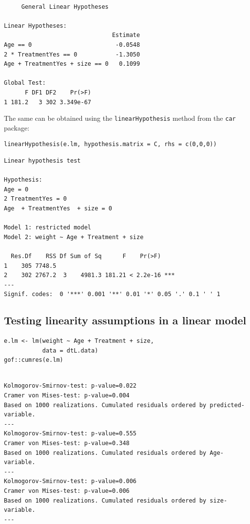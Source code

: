 \documentclass{article}
\begin{document}
\begin{verbatim}

	 General Linear Hypotheses

Linear Hypotheses:
                               Estimate
Age == 0                        -0.0548
2 * TreatmentYes == 0           -1.3050
Age + TreatmentYes + size == 0   0.1099

Global Test:
      F DF1 DF2    Pr(>F)
1 181.2   3 302 3.349e-67
\end{verbatim}

The same can be obtained using the \texttt{linearHypothesis} method from the \texttt{car} package:
\lstset{language=r,label= ,caption= ,captionpos=b,numbers=none}
\begin{lstlisting}
linearHypothesis(e.lm, hypothesis.matrix = C, rhs = c(0,0,0))
\end{lstlisting}

\begin{verbatim}
Linear hypothesis test

Hypothesis:
Age = 0
2 TreatmentYes = 0
Age  + TreatmentYes  + size = 0

Model 1: restricted model
Model 2: weight ~ Age + Treatment + size

  Res.Df    RSS Df Sum of Sq      F    Pr(>F)    
1    305 7748.5                                  
2    302 2767.2  3    4981.3 181.21 < 2.2e-16 ***
---
Signif. codes:  0 '***' 0.001 '**' 0.01 '*' 0.05 '.' 0.1 ' ' 1
\end{verbatim}

\subsection{Testing linearity assumptions in a linear model}
\label{sec:orgd07aca2}
\lstset{language=r,label= ,caption= ,captionpos=b,numbers=none}
\begin{lstlisting}
e.lm <- lm(weight ~ Age + Treatment + size,
           data = dtL.data)
gof::cumres(e.lm) 
\end{lstlisting}

\begin{verbatim}

Kolmogorov-Smirnov-test: p-value=0.022
Cramer von Mises-test: p-value=0.004
Based on 1000 realizations. Cumulated residuals ordered by predicted-variable.
---
Kolmogorov-Smirnov-test: p-value=0.555
Cramer von Mises-test: p-value=0.348
Based on 1000 realizations. Cumulated residuals ordered by Age-variable.
---
Kolmogorov-Smirnov-test: p-value=0.006
Cramer von Mises-test: p-value=0.006
Based on 1000 realizations. Cumulated residuals ordered by size-variable.
---
\end{verbatim}
\end{document}
